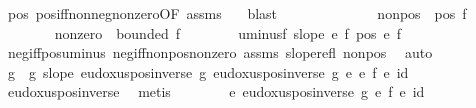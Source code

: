 \begin{isabellebody}
\ pos\ pos{\isacharunderscore}{\kern0pt}iff{\isacharunderscore}{\kern0pt}nonneg{\isacharunderscore}{\kern0pt}nonzero{\isacharbrackleft}{\kern0pt}OF\ assms{\isacharbrackright}{\kern0pt}\ {\isacharasterisk}{\kern0pt}\ \isamarkupfalse%
\ blast{\isacharplus}{\kern0pt}\isanewline
\ \ \isacommand{{\isacharbraceright}{\kern0pt}}\isamarkupfalse%
\isanewline
\ \ \isamarkupfalse%
\isanewline
\ \ \isacommand{{\isacharbraceleft}{\kern0pt}}\isamarkupfalse%
\isanewline
\ \ \ \ \isamarkupfalse%
\ nonpos{\isacharcolon}{\kern0pt}\ {\isachardoublequoteopen}{\isasymnot}\ pos\ f{\isachardoublequoteclose}\isanewline
\ \ \ \ \isacommand{{\isacharbraceleft}{\kern0pt}}\isamarkupfalse%
\isanewline
\ \ \ \ \ \ \isamarkupfalse%
\ nonzero{\isacharcolon}{\kern0pt}\ {\isachardoublequoteopen}{\isasymnot}\ bounded\ f{\isachardoublequoteclose}\isanewline
\ \ \ \ \ \ \isamarkupfalse%
\ uminus{\isacharunderscore}{\kern0pt}f{\isacharcolon}{\kern0pt}\ {\isachardoublequoteopen}slope\ {\isacharparenleft}{\kern0pt}{\isacharminus}{\kern0pt}\isactrlsub e\ f{\isacharparenright}{\kern0pt}{\isachardoublequoteclose}\ {\isachardoublequoteopen}pos\ {\isacharparenleft}{\kern0pt}{\isacharminus}{\kern0pt}\isactrlsub e\ f{\isacharparenright}{\kern0pt}{\isachardoublequoteclose}\ \isamarkupfalse%
\ neg{\isacharunderscore}{\kern0pt}iff{\isacharunderscore}{\kern0pt}pos{\isacharunderscore}{\kern0pt}uminus\ neg{\isacharunderscore}{\kern0pt}iff{\isacharunderscore}{\kern0pt}nonpos{\isacharunderscore}{\kern0pt}nonzero\ assms\ slope{\isacharunderscore}{\kern0pt}refl\ nonpos\ \isamarkupfalse%
\ auto\isanewline
\ \ \ \ \ \ \isamarkupfalse%
\ \isamarkupfalse%
\ g\ \ g{\isacharcolon}{\kern0pt}\ {\isachardoublequoteopen}slope\ {\isacharparenleft}{\kern0pt}eudoxus{\isacharunderscore}{\kern0pt}pos{\isacharunderscore}{\kern0pt}inverse\ g{\isacharparenright}{\kern0pt}{\isachardoublequoteclose}\ {\isachardoublequoteopen}eudoxus{\isacharunderscore}{\kern0pt}pos{\isacharunderscore}{\kern0pt}inverse\ g\ {\isacharasterisk}{\kern0pt}\isactrlsub e\ {\isacharparenleft}{\kern0pt}{\isacharminus}{\kern0pt}\isactrlsub e\ f{\isacharparenright}{\kern0pt}\ {\isasymsim}\isactrlsub e\ id{\isachardoublequoteclose}\ \isamarkupfalse%
\ eudoxus{\isacharunderscore}{\kern0pt}pos{\isacharunderscore}{\kern0pt}inverse\ \isamarkupfalse%
\ metis\isanewline
\ \ \ \ \ \ \isamarkupfalse%
\ {\isachardoublequoteopen}{\isacharminus}{\kern0pt}\isactrlsub e\ {\isacharparenleft}{\kern0pt}eudoxus{\isacharunderscore}{\kern0pt}pos{\isacharunderscore}{\kern0pt}inverse\ g{\isacharparenright}{\kern0pt}\ {\isacharasterisk}{\kern0pt}\isactrlsub e\ f\ {\isasymsim}\isactrlsub e\ id{\isachardoublequoteclose}\ \isamarkupfalse%

\end{isabellebody}
